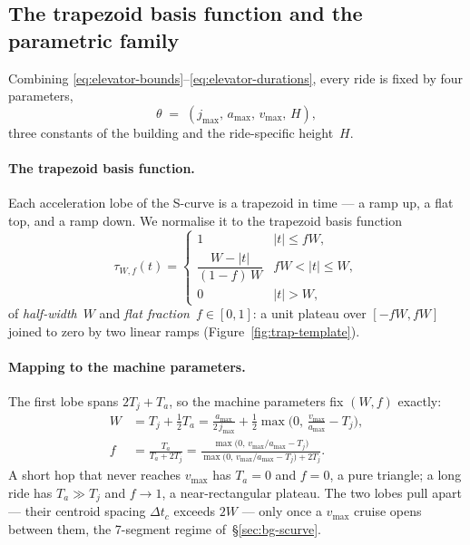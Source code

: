 \documentclass[manuscript,review,screen]{acmart}
\begin{document}
\subsection{The trapezoid basis function and the parametric family}
\label{sec:bg-family}

Combining \eqref{eq:elevator-bounds}--\eqref{eq:elevator-durations},
every ride is fixed by four parameters,
\begin{equation}
  \boxed{\theta \;=\; (j_{\max},\, a_{\max},\, v_{\max},\, H)},
  \label{eq:elevator-params}
\end{equation}
three constants of the building and the ride-specific height~$H$.

\paragraph{The trapezoid basis function.}
Each acceleration lobe of the S-curve is a trapezoid in time --- a
ramp up, a flat top, and a ramp down.  We normalise it to the
trapezoid basis function
\begin{equation}
  \tau_{W,f}(t)=
  \begin{cases}
    1 & |t|\le fW,\\
    \dfrac{W-|t|}{(1-f)\,W} & fW < |t|\le W,\\
    0 & |t|>W,
  \end{cases}
  \label{eq:trap-template}
\end{equation}
of \emph{half-width}~$W$ and \emph{flat fraction}~$f\in[0,1]$: a
unit plateau over $[-fW,fW]$ joined to zero by two linear ramps
(Figure~\ref{fig:trap-template}).

\paragraph{Mapping to the machine parameters.}
The first lobe spans $2T_j+T_a$, so the machine parameters fix
$(W,f)$ exactly:
\begin{align}
  W &= T_j+\tfrac12 T_a
     = \frac{a_{\max}}{2\,j_{\max}}
       +\tfrac12\!\max\!\Big(0,\,\tfrac{v_{\max}}{a_{\max}}-T_j\Big),
     \label{eq:W-from-kinematics}\\
  f &= \frac{T_a}{T_a+2T_j}
     = \frac{\max\!\big(0,\,v_{\max}/a_{\max}-T_j\big)}
            {\max\!\big(0,\,v_{\max}/a_{\max}-T_j\big)+2T_j}.
     \label{eq:f-from-kinematics}
\end{align}
A short hop that never reaches $v_{\max}$ has $T_a\!=\!0$ and
$f\!=\!0$, a pure triangle; a long ride has $T_a\!\gg\!T_j$ and
$f\!\to\!1$, a near-rectangular plateau.  The two lobes pull
apart --- their centroid spacing $\Delta t_c$ exceeds $2W$ ---
only once a $v_{\max}$ cruise opens between them, the 7-segment
regime of~\S\ref{sec:bg-scurve}.
\end{document}
